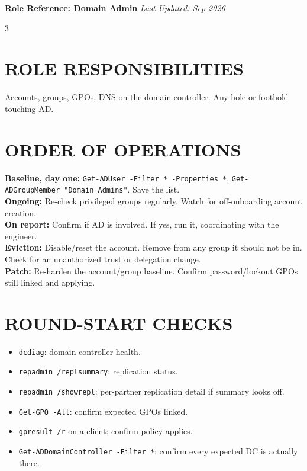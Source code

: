 \documentclass[7pt,landscape]{article}
\begin{document}
\textbf{Role Reference: Domain Admin} \hfill \textit{Last Updated: Sep 2026}
\raggedcolumns
\begin{multicols*}{3}

\section{ROLE RESPONSIBILITIES}
Accounts, groups, GPOs, DNS on the domain controller. Any hole or foothold touching AD.

\section{ORDER OF OPERATIONS}
\textbf{Baseline, day one:} \texttt{Get-ADUser -Filter * -Properties *}, \texttt{Get-ADGroupMember "Domain Admins"}. Save the list. \\
\textbf{Ongoing:} Re-check privileged groups regularly. Watch for off-onboarding account creation. \\
\textbf{On report:} Confirm if AD is involved. If yes, run it, coordinating with the engineer. \\
\textbf{Eviction:} Disable/reset the account. Remove from any group it should not be in. Check for an unauthorized trust or delegation change. \\
\textbf{Patch:} Re-harden the account/group baseline. Confirm password/lockout GPOs still linked and applying.

\section{ROUND-START CHECKS}
\begin{itemize}
    \item \texttt{dcdiag}: domain controller health.
    \item \texttt{repadmin /replsummary}: replication status.
    \item \texttt{repadmin /showrepl}: per-partner replication detail if summary looks off.
    \item \texttt{Get-GPO -All}: confirm expected GPOs linked.
    \item \texttt{gpresult /r} on a client: confirm policy applies.
    \item \texttt{Get-ADDomainController -Filter *}: confirm every expected DC is actually there.
\end{itemize}


\end{multicols*}
\end{document}
